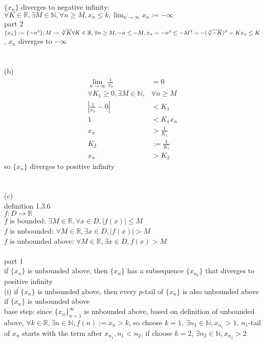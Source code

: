\documentclass[12pt, border = 4pt, multi]{article} %
\begin{document}
$\{x_n\}$ diverges to negative infinity: $\forall K \in \mathbb{R}, \exists M \in \mathbb{N}, \forall n \geq M, x_n \leq k, \lim_{n \rightarrow \infty} x_n := -\infty$\\
part 2\\
$\{x_n\} := \{-n ^ 3\}, M := \sqrt[3]{K}\\
\forall K \in \mathbb{R}, \forall n \geq M, -n \leq -M, x_n = -n ^ 3 \leq -M ^ 3 = -(\sqrt[3]{-K}) ^ 3 = K\\
x_n \leq K$, $x_n$ diverges to $-\infty$\\
\\
\\
(b)\\
\begin{align*}
\lim_{n \rightarrow \infty} \frac{1}{x_n} &= 0\\
\forall K_1 \geq 0, \exists M \in \mathbb{N}, &\forall n \geq M\\
\left|\frac{1}{x_n} - 0\right| &< K_1\\
1 &< K_1 x_n\\
x_n &> \frac{1}{K_1}\\
K_2 &:= \frac{1}{K_1}\\
x_n &> K_2
\end{align*}
so $\{x_n\}$ diverges to positive infinity\\
\\
\\
(c)\\
definition 1.3.6\\
$f: D \rightarrow \mathbb{R}$\\
$f$ is bounded: $\exists M \in \mathbb{R}, \forall x \in D, |f(x)| \leq M$\\
$f$ is unbounded: $\forall M \in \mathbb{R}, \exists x \in D, |f(x)| > M$\\
$f$ is unbounded above: $\forall M \in \mathbb{R}, \exists x \in D, f(x) > M$\\
\\
part 1\\
if $\{x_n\}$ is unbounded above, then $\{x_n\}$ has a subsequence $\{x_{n_k}\}$ that diverges to positive infinity\\
(i) if $\{x_n\}$ is unbounded above, then every $p$-tail of $\{x_n\}$ is also unbounded above\\
if $\{x_n\}$ is unbounded above\\
base step: since $\{x_n\}_{n = 1} ^ {\infty}$ is unbounded above,  based on definition of unbounded above, $\forall k \in \mathbb{R}, \exists n \in \mathbb{N}, f(n) := x_n > k$, so choose $k = 1$, $\exists n_1 \in \mathbb{N}, x_{n_1} > 1$, $n_1$-tail of $x_n$ starts with the term after $x_{n_1}, n_1 < n_2$, if choose $k = 2$, $\exists n_2 \in \mathbb{N}, x_{n_2} > 2$\\
\end{document}
